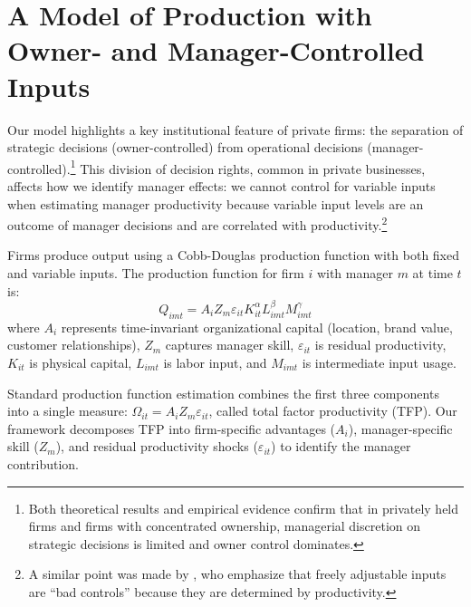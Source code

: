 \documentclass[11pt,a4paper]{article}
\begin{document}
\section{A Model of Production with Owner- and Manager-Controlled Inputs}

Our model highlights a key institutional feature of private firms: the separation of strategic decisions (owner-controlled) from operational decisions (manager-controlled).\footnote{Both theoretical results \citep{fama1983separation, jensen1976theory, burkart2003family, schulze2021property} and empirical evidence \citep{durand2003ownership, gao2015comparison, quigley2022does, cole2008privately, nakazato2011executive, gompers2023market, bloom2012organization, wang2019decentralization, buffington2017mops} confirm that in privately held firms and firms with concentrated ownership, managerial discretion on strategic decisions is limited and owner control dominates.} This division of decision rights, common in private businesses, affects how we identify manager effects: we cannot control for variable inputs when estimating manager productivity because variable input levels are an outcome of manager decisions and are correlated with productivity.\footnote{A similar point was made by \citet{Gandhi2020-nu}, who emphasize that freely adjustable inputs are ``bad controls'' because they are determined by productivity.} 

Firms produce output using a Cobb-Douglas production function with both fixed and variable inputs. The production function for firm $i$ with manager $m$ at time $t$ is:
\begin{equation}\label{eq:production}
Q_{imt} = A_i Z_{m} \varepsilon_{it} K_{it}^\alpha L_{imt}^{\beta} M_{imt}^{\gamma}
\end{equation}
where $A_i$ represents time-invariant organizational capital (location, brand value, customer relationships), $Z_m$ captures manager skill, $\varepsilon_{it}$ is residual productivity, $K_{it}$ is physical capital, $L_{imt}$ is labor input, and $M_{imt}$ is intermediate input usage. 

Standard production function estimation combines the first three components into a single measure: $\Omega_{it} = A_i Z_m \varepsilon_{it}$, called total factor productivity (TFP). Our framework decomposes TFP into firm-specific advantages ($A_i$), manager-specific skill ($Z_m$), and residual productivity shocks ($\varepsilon_{it}$) to identify the manager contribution.
\end{document}
